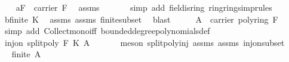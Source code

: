 \begin{isabellebody}
\ \ \isamarkupfalse%
\ a{\isacharcolon}{\kern0pt}{\isachardoublequoteopen}{\isasymzero}\isactrlbsub F\isactrlesub \ {\isasymin}\ carrier\ F{\isachardoublequoteclose}\ \isamarkupfalse%
\ assms{\isacharparenleft}{\kern0pt}{}{\isacharparenright}{\kern0pt}\ \isanewline
\ \ \ \ \isamarkupfalse%
\ {\isacharparenleft}{\kern0pt}simp\ add{\isacharcolon}{\kern0pt}\ field{\isachardot}{\kern0pt}is{\isacharunderscore}{\kern0pt}ring\ ring{\isachardot}{\kern0pt}ring{\isacharunderscore}{\kern0pt}simprules{\isacharparenleft}{\kern0pt}{}{\isacharparenright}{\kern0pt}{\isacharparenright}{\kern0pt}\isanewline
\ \ \isamarkupfalse%
\ b{\isacharcolon}{\kern0pt}{\isachardoublequoteopen}finite\ K{\isachardoublequoteclose}\ \isamarkupfalse%
\ assms{\isacharparenleft}{\kern0pt}{}{\isacharparenright}{\kern0pt}\ assms{\isacharparenleft}{\kern0pt}{}{\isacharparenright}{\kern0pt}\ finite{\isacharunderscore}{\kern0pt}subset\ \isamarkupfalse%
\ blast\isanewline
\ \ \isamarkupfalse%
\ \isamarkupfalse%
\ {\isachardoublequoteopen}{\isacharquery}{\kern0pt}A\ {\isasymsubseteq}\ carrier\ {\isacharparenleft}{\kern0pt}poly{\isacharunderscore}{\kern0pt}ring\ F{\isacharparenright}{\kern0pt}{\isachardoublequoteclose}\isanewline
\ \ \ \ \isamarkupfalse%
\ {\isacharparenleft}{\kern0pt}simp\ add{\isacharcolon}{\kern0pt}\ Collect{\isacharunderscore}{\kern0pt}mono{\isacharunderscore}{\kern0pt}iff\ bounded{\isacharunderscore}{\kern0pt}degree{\isacharunderscore}{\kern0pt}polynomials{\isacharunderscore}{\kern0pt}def{\isacharparenright}{\kern0pt}\isanewline
\ \ \isamarkupfalse%
\ \isamarkupfalse%
\ {\isachardoublequoteopen}inj{\isacharunderscore}{\kern0pt}on\ {\isacharparenleft}{\kern0pt}split{\isacharunderscore}{\kern0pt}poly\ F\ K{\isacharparenright}{\kern0pt}\ {\isacharquery}{\kern0pt}A{\isachardoublequoteclose}\ \isanewline
\ \ \ \ \isamarkupfalse%
\ {\isacharparenleft}{\kern0pt}meson\ split{\isacharunderscore}{\kern0pt}poly{\isacharunderscore}{\kern0pt}inj\ assms{\isacharparenleft}{\kern0pt}{}{\isacharparenright}{\kern0pt}\ assms{\isacharparenleft}{\kern0pt}{}{\isacharparenright}{\kern0pt}\ inj{\isacharunderscore}{\kern0pt}on{\isacharunderscore}{\kern0pt}subset{\isacharparenright}{\kern0pt}\isanewline
\ \ \isamarkupfalse%
\ \isamarkupfalse%
\ {\isachardoublequoteopen}finite\ {\isacharquery}{\kern0pt}A{\isachardoublequoteclose}\ \isamarkupfalse%

\end{isabellebody}
